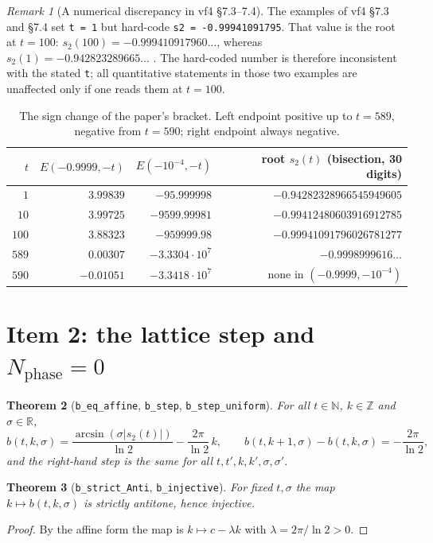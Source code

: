 \documentclass[11pt,a4paper]{article}
\newcommand{\R}{\mathbb{R}}
\newcommand{\N}{\mathbb{N}}
\newcommand{\Z}{\mathbb{Z}}
\newcommand{\lb}{\_\allowbreak}
\newcommand{\code}[1]{\texttt{#1}}
\newtheorem{theorem}{Theorem}[section]
\theoremstyle{definition}
\theoremstyle{remark}
\newtheorem{remark}[theorem]{Remark}
\begin{document}
\begin{remark}[A numerical discrepancy in vf4 \S7.3--7.4]\label{rem:s2value}
The examples of vf4 \S7.3 and \S7.4 set \code{t = 1} but hard-code
\code{s2 = -0.99941091795}.  That value is the root at $t=100$:
$s_2(100)=-0.999410917960\ldots$, whereas $s_2(1)=-0.942823289665\ldots$ .  The hard-coded
number is therefore inconsistent with the stated \code{t}; all quantitative statements in
those two examples are unaffected only if one reads them at $t=100$.
\end{remark}

\begin{table}[h]
\centering
\small
\begin{tabular}{rrrr}
\toprule
$t$ & $E(-0.9999,-t)$ & $E(-10^{-4},-t)$ & root $s_2(t)$ (bisection, 30 digits)\\
\midrule
$1$ & $3.99839$ & $-95.999998$ & $-0.94282328966545949605$\\
$10$ & $3.99725$ & $-9599.99981$ & $-0.99412480603916912785$\\
$100$ & $3.88323$ & $-959999.98$ & $-0.99941091796026781277$\\
$589$ & $0.00307$ & $-3.3304\cdot10^{7}$ & $-0.9998999616\ldots$\\
$590$ & $-0.01051$ & $-3.3418\cdot10^{7}$ & none in $(-0.9999,-10^{-4})$\\
\bottomrule
\end{tabular}
\caption{The sign change of the paper's bracket.  Left endpoint positive up to $t=589$,
negative from $t=590$; right endpoint always negative.}\label{tab:signs}
\end{table}

\section{Item 2: the lattice step and $N_{\mathrm{phase}}=0$}\label{sec:item2}

\begin{theorem}[\code{b\lb eq\lb affine}, \code{b\lb step}, \code{b\lb step\lb uniform}]
For all $t\in\N$, $k\in\Z$ and $\sigma\in\R$,
\[
  b(t,k,\sigma)=\frac{\arcsin(\sigma|s_2(t)|)}{\ln2}-\frac{2\pi}{\ln2}\,k,
  \qquad
  b(t,k+1,\sigma)-b(t,k,\sigma)=-\frac{2\pi}{\ln2},
\]
and the right-hand step is the same for all $t,t',k,k',\sigma,\sigma'$.
\end{theorem}

\begin{theorem}[\code{b\lb strict\lb Anti}, \code{b\lb injective}]
For fixed $t,\sigma$ the map $k\mapsto b(t,k,\sigma)$ is strictly antitone, hence
injective.
\end{theorem}
\begin{proof}
By the affine form the map is $k\mapsto c-\lambda k$ with $\lambda=2\pi/\ln2>0$.
\end{proof}
\end{document}
